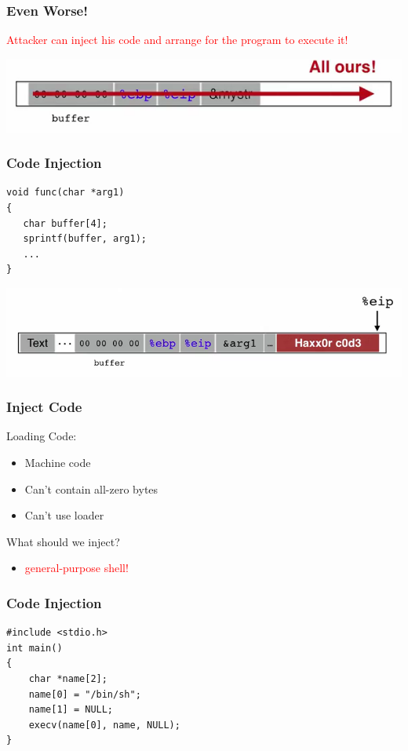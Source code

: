 \documentclass[serif,mathserif]{beamer}
\begin{document}
\begin{frame}[fragile]
  \frametitle{Even Worse!}
\textcolor{red}{Attacker can inject his code and arrange for the program to execute it!}
\begin{center}
\includegraphics[scale=0.35]{stackff9.png}
\end{center}
\end{frame}


\begin{frame}[fragile]
  \frametitle{Code Injection}
\begin{lstlisting}
void func(char *arg1)
{
   char buffer[4];
   sprintf(buffer, arg1);
   ...
}
\end{lstlisting}

\begin{center}
\includegraphics[scale=0.35]{stackff10.png}
\end{center}
\end{frame}


\begin{frame}
  \frametitle{Inject Code}
Loading Code:
\\
\begin{itemize}
	\item Machine code
	\item Can't contain all-zero bytes
	\item Can't use loader 
\end{itemize}

What should we inject?
\\
\begin{itemize}
\item
\textcolor{red}{general-purpose shell!}
\end{itemize}
\end{frame}

\begin{frame}[fragile]
  \frametitle{Code Injection}
\begin{lstlisting}
#include <stdio.h>
int main()
{
    char *name[2];
    name[0] = "/bin/sh";
    name[1] = NULL;
    execv(name[0], name, NULL);
}
\end{lstlisting}
\end{frame}
\end{document}

